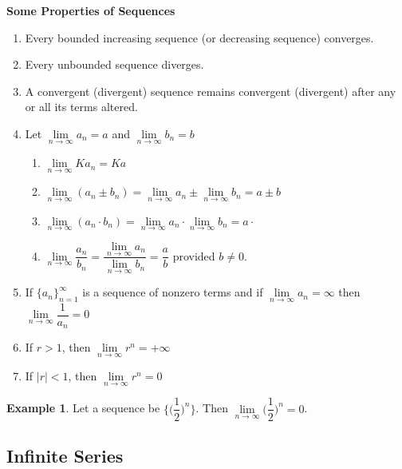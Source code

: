 \documentclass[11pt,a4paper]{article}
\theoremstyle{definition}
\newtheorem{exa}[thm]{Example}
\newcommand{\subhead}[1]{%
  \par\medskip\noindent\textbf{#1}\par\nobreak\smallskip}
\begin{document}
\subhead{Some Properties of Sequences}
\begin{enumerate}
\item Every bounded increasing sequence (or decreasing sequence) converges.
\item Every unbounded sequence diverges.
\item A convergent (divergent) sequence remains convergent (divergent) after any or all its terms altered.
\item Let $\lim\limits_{n \rightarrow \infty} a_n = a$ and $\lim\limits_{n \rightarrow \infty} b_n = b$
\begin{enumerate}
     \item $\lim\limits_{n \rightarrow \infty} K a_n = Ka$

     \item $\lim\limits_{n \rightarrow \infty}( a_n\pm b_n) = \lim\limits_{n \rightarrow \infty} a_n  \pm \lim\limits_{n \rightarrow \infty} b_n  = a \pm b$

     \item $\lim\limits_{n \rightarrow \infty} (a_n\cdot b_n) = \lim\limits_{n \rightarrow \infty} a_n \cdot \lim\limits_{n \rightarrow \infty} b_n = a\cdot$

     \item $\lim\limits_{n \rightarrow \infty} \dfrac{a_n}{b_n} = \dfrac{ \lim\limits_{n \rightarrow \infty} a_n}{\lim\limits_{n \rightarrow \infty} b_n} = \dfrac{a}{b}$ provided $b \neq 0$.
\end{enumerate}

\item If $\{a_n\}^{\infty}_{n=1}$ is a sequence of nonzero terms and if $\lim\limits_{n \rightarrow \infty} a_n = \infty$ then $\lim\limits_{n \rightarrow \infty}\dfrac{1}{a_n} = 0$

\item If $r>1$, then $\lim\limits_{n \rightarrow \infty} r^n = +\infty$

\item If $|r|<1$, then $\lim\limits_{n \rightarrow \infty} r^n = 0$
\end{enumerate}

\begin{exa}


Let a sequence be $\Big\{\Big(\dfrac{1}{2}\Big)^n\Big\}$. Then $\lim\limits_{n \rightarrow \infty} \Bigg(\dfrac{1}{2}\Bigg)^n = 0$.
\end{exa}


\subsection{Infinite Series}
\end{document}
